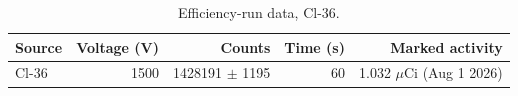 \begin{table}[htbp]
\centering
\caption{Efficiency-run data, Cl-36.}
\label{tab:eff-raw}
\begin{tabular}{lrrrr}
\toprule
Source & Voltage (V) & Counts & Time (s) & Marked activity \\
\midrule
Cl-36 & 1500 & 1428191 $\pm$ 1195 & 60 & 1.032 $\mu$Ci (Aug 1 2026) \\
\bottomrule
\end{tabular}
\end{table}
